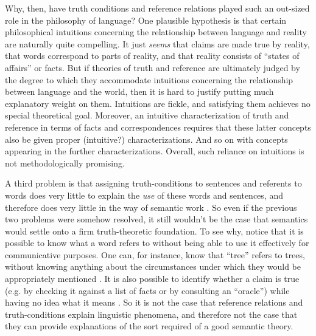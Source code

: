 Why, then, have truth conditions and reference relations played such an out-sized role in the philosophy of language? One plausible hypothesis is that certain philosophical intuitions concerning the relationship between language and reality are naturally quite compelling. It just \textit{seems} that claims are made true by reality, that words correspond to parts of reality, and that reality consists of ``states of affairs'' or facts. But if theories of truth and reference are ultimately judged by the degree to which they accommodate intuitions concerning the relationship between language and the world, then it is hard to justify putting much explanatory weight on them. Intuitions are fickle, and satisfying them achieves no special theoretical goal. Moreover, an intuitive characterization of truth and reference in terms of facts and correspondences requires that these latter concepts also be given proper (intuitive?) characterizations. And so on with concepts appearing in the further characterizations. Overall, such reliance on intuitions is not methodologically promising.

A third problem is that assigning truth-conditions to sentences and referents to words does very little to explain the \textit{use} of these words and sentences, and therefore does very little in the way of semantic work \citep{Brandom:1994,Block:1986}. So even if the previous two problems were somehow resolved, it still wouldn't be the case that semantics would settle onto a firm truth-theoretic foundation. To see why, notice that it is possible to know what a word refers to without being able to use it effectively for communicative purposes. One can, for instance, know that ``tree'' refers to trees, without knowing anything about the circumstances under which they would be appropriately mentioned \citep{Block:1986}. It is also possible to identify whether a claim is true (e.g. by checking it against a list of facts or by consulting an ``oracle'') while having no idea what it means \citep{Block:1986}. So it is not the case that reference relations and truth-conditions explain linguistic phenomena, and therefore not the case that they can provide explanations of the sort required of a good semantic theory. 

